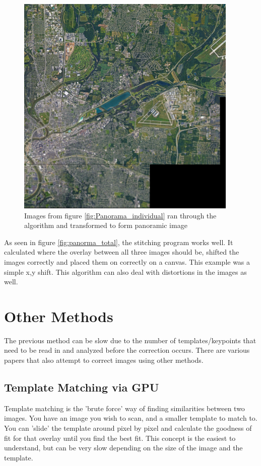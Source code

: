 \documentclass[12pt]{article} %
\begin{document}
\begin{figure}[!h]
\includegraphics[width=\textwidth]{Dayton_panorama/total_stitch.png}
\caption{Images from figure \ref{fig:Panorama_individual} ran through the algorithm and transformed to form panoramic image}
\label{fig:panorama_total}
\end{figure}

As seen in figure \ref{fig:panorma_total}, the stitching program works well. It calculated where the overlay between all three images should be, shifted the images correctly and placed them on correctly on a canvas. This example was a simple x,y shift. This algorithm can also deal with distortions in the images as well. 

\section{Other Methods}
The previous method can be slow due to the number of templates/keypoints that need to be read in and analyzed before the correction occurs. There are various papers that also attempt to correct images using other methods. 

\subsection{Template Matching via GPU}
	Template matching is the 'brute force' way of finding similarities between two images. You have an image you wish to scan, and a smaller template to match to. You can 'slide' the template around pixel by pixel and calculate the goodness of fit for that overlay until you find the best fit. This concept is the easiest to understand, but can be very slow depending on the size of the image and the template. 
	
\end{document}
